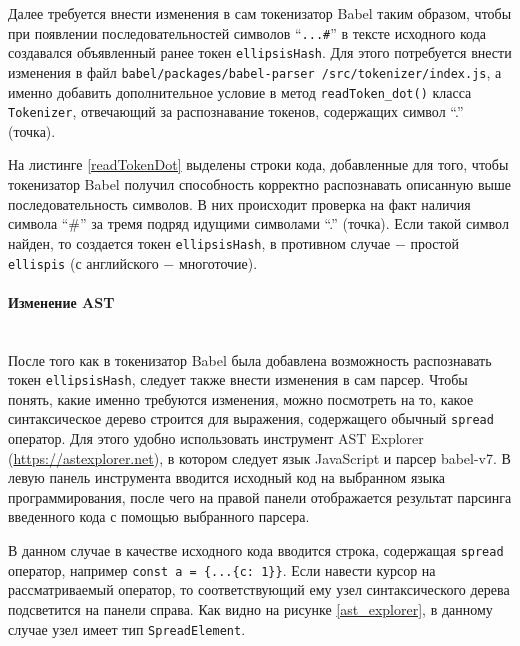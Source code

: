 \documentclass[14pt, a4paper]{article}
\def\code#1{\texttt{#1}} %
\begin{document}


Далее требуется внести изменения в сам токенизатор Babel таким образом, чтобы при появлении последовательностей символов
``\code{...\#}'' в тексте исходного кода создавался объявленный ранее токен \code{ellipsisHash}. Для этого
потребуется внести изменения в файл \code{babel/packages/babel-parser
  /src/tokenizer/index.js}, а именно добавить дополнительное условие в метод \code{readToken\_dot()} класса \code{Tokenizer}, отвечающий за распознавание токенов,
содержащих символ ``.'' (точка).


На листинге \ref{readTokenDot} выделены строки кода, добавленные для того, чтобы токенизатор Babel
получил способность корректно распознавать описанную выше последовательность символов. В них происходит
проверка на факт наличия символа ``\#'' за тремя подряд идущими символами ``.'' (точка).
Если такой символ найден, то создается токен \code{ellipsisHash}, в противном случае
$-$ простой \code{ellispis} (с английского $-$ многоточие).

\pagebreak 
\paragraph{Изменение AST} \mbox{}\\

После того как в токенизатор Babel была добавлена возможность распознавать токен \code{ellipsisHash},
следует также внести изменения в сам парсер. Чтобы понять, какие именно требуются изменения, можно посмотреть на то, какое
синтаксическое дерево строится для выражения, содержащего обычный \code{spread} оператор. Для этого удобно использовать
инструмент AST Explorer (\url{https://astexplorer.net}), в котором следует язык JavaScript и парсер babel-v7.
В левую панель инструмента вводится исходный код на выбранном языка программирования, после чего на
правой панели отображается результат парсинга введенного кода с помощью выбранного парсера.

В данном случае в качестве исходного кода вводится строка, содержащая \code{spread} оператор, например
\code{const a = \{...\{c: 1\}\}}. Если навести курсор на рассматриваемый оператор, то соответствующий
ему узел синтаксического дерева подсветится на панели справа. Как видно на рисунке \ref{ast_explorer},
в данному случае узел имеет тип \code{SpreadElement}.
\end{document}
